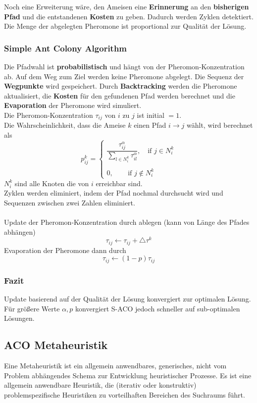 \documentclass[a4paper]{article}
\begin{document}
Noch eine Erweiterung wäre, den Ameisen eine \textbf{Erinnerung} an den\textbf{ bisherigen Pfad} und die entstandenen \textbf{Kosten} zu geben. Dadurch werden Zyklen detektiert. Die Menge der abgelegten Pheromone ist proportional zur Qualität der Lösung.

\subsubsection{Simple Ant Colony Algorithm}
Die Pfadwahl ist \textbf{probabilistisch} und hängt von der Pheromon-Konzentration ab. Auf dem Weg zum Ziel werden keine Pheromone abgelegt. Die Sequenz der \textbf{Wegpunkte} wird gespeichert. Durch \textbf{Backtracking} werden die Pheromone aktualisiert, die \textbf{Kosten} für den gefundenen Pfad werden berechnet und die \textbf{Evaporation} der Pheromone wird simuliert.\\

Die Pheromon-Konzentration $\tau_{ij}$ von $i$ zu $j$ ist initial $= 1$.\\
Die Wahrscheinlichkeit, dass die Ameise $k$ einen Pfad $i\rightarrow j$ wählt, wird berechnet als
$$p_{ij}^k = \left\{
\begin{matrix}
\dfrac{\tau_{ij}^\alpha}{\sum_{l \in N_i^k}\tau_{il}^\alpha}, \ \ \ \text{ if } j \in N_i^k\\\\
0, \ \ \ \ \ \ \ \ \text{ if } j\notin N_i^k
\end{matrix}
\right.$$
$N_i^k$ sind alle Knoten die von $i$ erreichbar sind.\\

Zyklen werden eliminiert, indem der Pfad nochmal durchsucht wird und Sequenzen zwischen zwei Zahlen eliminiert.\\
\\
Update der Pheromon-Konzentration durch ablegen (kann von Länge des Pfades abhängen)
$$\tau_{ij} \leftarrow \tau_{ij}+\triangle\tau^k$$ 
Evaporation der Pheromone dann durch
$$\tau_{ij} \leftarrow (1-p)\tau_{ij}$$ 

\subsubsection{Fazit}
Update basierend auf der Qualität der Lösung konvergiert zur optimalen Lösung. Für größere Werte $\alpha,p$ konvergiert S-ACO jedoch schneller auf sub-optimalen Lösungen.

 
\subsection{ACO Metaheuristik}
Eine Metaheuristik ist ein allgemein anwendbares, generisches, nicht vom Problem abhängendes Schema zur Entwicklung heuristischer Prozesse. Es ist eine allgemein anwendbare Heuristik, die (iterativ oder konstruktiv) problemspezifische Heuristiken zu vorteilhaften Bereichen des Suchraums führt.\\
\end{document}
